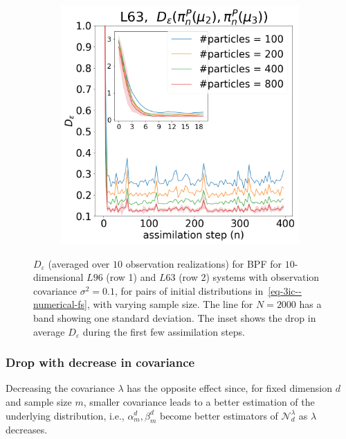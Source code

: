 \begin{figure}[!t]
\begin{subfigure}{0.3\textwidth}
\end{subfigure}\hspace{0mm}%
\begin{subfigure}{0.3\textwidth}
\includegraphics[width=\columnwidth]{numerical-fs/plots/figures-BPF-L63-1-dist_2_vs_3.png}
\end{subfigure}\hspace{0mm}
\caption{$D_\varepsilon$ (averaged over $10$ observation realizations) for BPF for $10$-dimensional $L96$ (row 1) and $L63$ (row 2) systems with observation covariance $\sigma^2=0.1$, for pairs of initial distributions in~\eqref{eq-3ic--numerical-fs}, with varying sample size. The line for $N = 2000$ has a band showing one standard deviation. The inset shows the drop in average $D_\varepsilon$ during the first few assimilation steps.}
\label{fig:plot-BPF--numerical-fs}
\end{figure}

\subsubsection{Drop with decrease in covariance} Decreasing the covariance $\lambda$ has the opposite effect since, for fixed dimension $d$ and sample size $m$, smaller covariance leads to a better estimation of the underlying distribution, i.e., $\alpha_m^d, \beta_m^d$ become better estimators of $\mathcal N_d^\lambda$ as $\lambda$ decreases.

